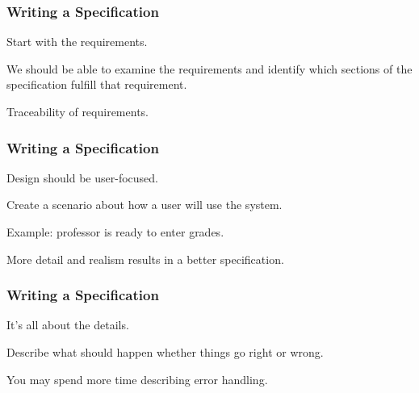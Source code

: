 \begin{frame}
\frametitle{Writing a Specification}

	\begin{changemargin}{1cm}
	Start with the requirements.
	
	We should be able to examine the requirements and identify which sections of the specification fulfill that requirement.

	Traceability of requirements. 

	\end{changemargin}
\end{frame}


\begin{frame}
\frametitle{Writing a Specification}

	\begin{changemargin}{1cm}
		Design should be user-focused.
		
		Create a scenario about how a user will use the system.
		
		Example: professor is ready to enter grades. 
		
		More detail and realism results in a better specification.
		
	\end{changemargin}
\end{frame}


\begin{frame}
\frametitle{Writing a Specification}

	\begin{changemargin}{1cm}
		It's all about the details.
		
		Describe what should happen whether things go right or wrong.
		
		You may spend more time describing error handling.
		
	\end{changemargin}
\end{frame}

